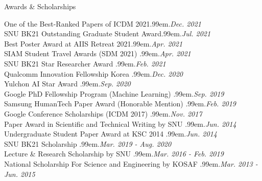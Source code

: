 \documentclass{resume} %
\makeatletter
\newcommand \Dotfill {\leavevmode \cleaders \hb@xt@ .99em{\hss .\hss }\hfill \kern \z@}
\makeatother
\begin{document}

\begin{rSection}{Awards \& Scholarships}

One of the Best-Ranked Papers of ICDM 2021\smallskip \Dotfill \emph{Dec. 2021} \\ 
SNU BK21 Outstanding Graduate Student Award\smallskip \Dotfill \emph{Jul. 2021} \\ 
Best Poster Award at AIIS Retreat 2021\smallskip \Dotfill \emph{Apr. 2021} \\ 
SIAM Student Travel Awards (SDM 2021) \smallskip \Dotfill \emph{Apr. 2021} \\ 
SNU BK21 Star Researcher Award \smallskip \Dotfill \emph{Feb. 2021} \\ 
Qualcomm Innovation Fellowship Korea \smallskip \Dotfill \emph{Dec. 2020} \\ 
Yulchon AI Star Award \smallskip \Dotfill \emph{Sep. 2020} \\ 
Google PhD Fellowship Program (Machine Learning) \smallskip \Dotfill \emph{Sep. 2019} \\ 
Samsung HumanTech Paper Award (Honorable Mention) \smallskip \Dotfill \emph{Feb. 2019} \\ 
Google Conference Scholarships (ICDM 2017) \smallskip \Dotfill \emph{Nov. 2017} \\ 
Paper Award in Scientific and Technical Writing by SNU \smallskip \Dotfill \emph{Jun. 2014} \\ 
Undergraduate Student Paper Award at KSC 2014 \smallskip \Dotfill \emph{Jun. 2014} \\
SNU BK21 Scholarship \smallskip \Dotfill \emph{Mar. 2019 - Aug. 2020} \\ 
Lecture \& Research Scholarship by SNU \smallskip \Dotfill \emph{Mar. 2016 - Feb. 2019} \\
National Scholarship For Science and Engineering by KOSAF \smallskip \Dotfill \emph{Mar. 2013 - Jun. 2015}

\end{rSection}

\end{document}
